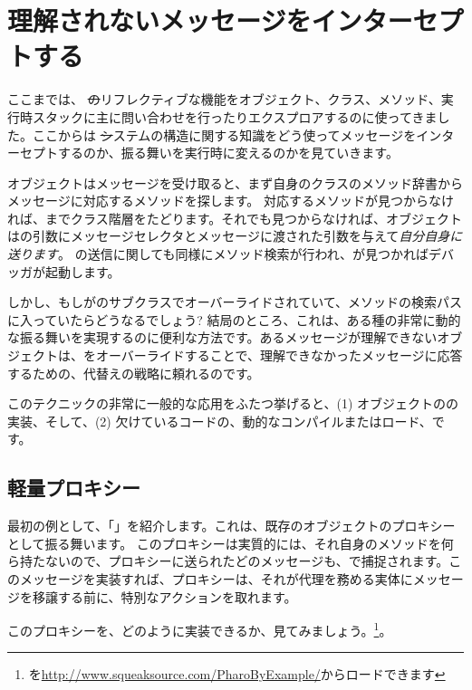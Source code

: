 \documentclass[a4paper,10pt,twoside]{book}
\begin{document}
\section{理解されないメッセージをインターセプトする}

ここまでは、 \st のリフレクティブな機能をオブジェクト、クラス、メソッド、実行時スタックに主に問い合わせを行ったりエクスプロアするのに使ってきました。ここからは \st システムの構造に関する知識をどう使ってメッセージをインターセプトするのか、振る舞いを実行時に変えるのかを見ていきます。

オブジェクトはメッセージを受け取ると、まず自身のクラスのメソッド辞書からメッセージに対応するメソッドを探します。
対応するメソッドが見つからなければ、までクラス階層をたどります。それでも見つからなければ、オブジェクトはの引数にメッセージセレクタとメッセージに渡された引数を与えて\emph{自分自身に送ります}。
の送信に関しても同様にメソッド検索が行われ、が見つかればデバッガが起動します。

しかし、もしがのサブクラスでオーバーライドされていて、メソッドの検索パスに入っていたらどうなるでしょう?
結局のところ、これは、ある種の非常に動的な振る舞いを実現するのに便利な方法です。あるメッセージが理解できないオブジェクトは、をオーバーライドすることで、理解できなかったメッセージに応答するための、代替えの戦略に頼れるのです。

このテクニックの非常に一般的な応用をふたつ挙げると、(1) オブジェクトのの実装、そして、(2) 欠けているコードの、動的なコンパイルまたはロード、です。

\subsection{軽量プロキシー}

最初の例として、「」を紹介します。これは、既存のオブジェクトのプロキシーとして振る舞います。
このプロキシーは実質的には、それ自身のメソッドを何ら持たないので、プロキシーに送られたどのメッセージも、で捕捉されます。このメッセージを実装すれば、プロキシーは、それが代理を務める実体にメッセージを移譲する前に、特別なアクションを取れます。

このプロキシーを、どのように実装できるか、見てみましょう。\footnote{を\url{http://www.squeaksource.com/PharoByExample/}からロードできます}。
\end{document}
